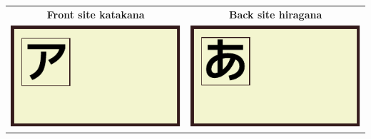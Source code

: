 \begin{center}
\begin{tabular}{cc}
\textbf{Front site katakana}&\textbf{Back site hiragana}\\
\includegraphics[scale=1.5]{../share/i/fcak.pdf}%
&
\includegraphics[scale=1.5]{../share/i/fcah.pdf}%
\\
\end{tabular}
\end{center}

